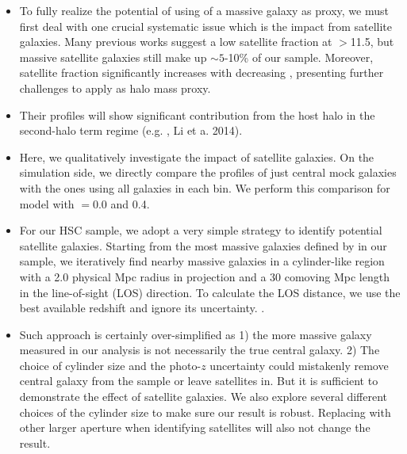 \documentclass[a4paper,fleqn,usenatbib]{mnras}
\begin{document}
    \begin{itemize}
        
        \item To fully realize the potential of using \mstar{} of a massive galaxy as \mhalo{}
            proxy, we must first deal with one crucial systematic issue which is the impact
            from satellite galaxies.
            Many previous works suggest a low satellite fraction at \logms{}$>$11.5, but 
            massive satellite galaxies still make up $\sim 5$-10\% of our sample.
            Moreover, satellite fraction significantly increases with decreasing \mstar{},
            presenting further challenges to apply \mstar{} as halo mass proxy.
        
        \item {}
            Their \dsigma{} profiles will show significant contribution from the host halo 
            in the second-halo term regime (e.g. \addref{}, Li et a. 2014).
        
        \item Here, we qualitatively investigate the impact of satellite galaxies. 
            On the simulation side, we directly compare the \dsigma{} profiles of just central 
            mock galaxies with the ones using all galaxies in each bin.
            We perform this comparison for model with \sigmh{}$=0.0$ and 0.4.
        
        \item For our HSC sample, we adopt a very simple strategy to identify potential 
            satellite galaxies. 
            Starting from the most massive galaxies defined by \mmax{} in our sample, 
            we iteratively find nearby massive galaxies in a cylinder-like region with 
            a 2.0 physical Mpc radius in projection and a 30 comoving Mpc length in the 
            line-of-sight (LOS) direction. 
            To calculate the LOS distance, we use the best available redshift and ignore 
            its uncertainty.
            .
            
        \item Such approach is certainly over-simplified as 1) the more massive galaxy 
            measured in our analysis is not necessarily the true central galaxy.
            2) The choice of cylinder size and the photo-$z$ uncertainty could mistakenly 
            remove central galaxy from the sample or leave satellites in.
            But it is sufficient to demonstrate the effect of satellite galaxies.
            We also explore several different choices of the cylinder size to make sure
            our result is robust.
            Replacing \mmax{} with other larger aperture \mstar{} when identifying satellites 
            will also not change the result.
        

\end{itemize}
\end{document}
